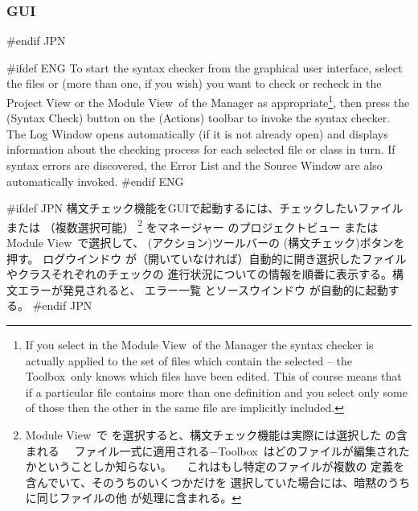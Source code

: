 \documentclass[\pformat,12pt]{article}
\newcommand{\Toolbox}{Toolbox}
\newcommand{\vdmModView}{\guicmd{Module View}}
\newcommand{\vdmModView}{\guicmd{モジュールビュー}}
\newcommand{\Toolbox}{Toolbox}
\newcommand{\vdmModView}{\guicmd{VDM View}}
\newcommand{\vdmModView}{\guicmd{VDMビュー}}
\newcommand{\guicmd}[1]{{\sf #1}}
\newcommand{\guicmd}[1]{{\gt #1}}
\begin{document}
\subsubsection{GUI}
#endif JPN

#ifdef ENG
To start the syntax checker from the graphical user interface, select 
the files or  (more than
one, if you wish) you want to check or recheck in the \guicmd{Project
  View} or the \vdmModView\ of the \guicmd{Manager} as
appropriate\footnote{If you select 
   in the 
  \vdmModView\ of the \guicmd{Manager} the syntax checker is
  actually applied to the set of files which contain the selected
   -- the \Toolbox\ only
  knows which files have been edited. This of course means
  that if a particular file contains more than one
   definition and you 
  select only some of those 
  then the other  in the
  same file are implicitly included.}, then press the
(\guicmd{Syntax Check})
button on the (\guicmd{Actions})
toolbar to invoke the syntax checker. The \guicmd{Log Window} opens
automatically (if it is not already open) and displays information
about the checking process for each selected file or class in turn. If
syntax errors are discovered, the \guicmd{Error 
List} and the \guicmd{Source Window} are also 
au\-to\-matically invoked. 
#endif ENG

#ifdef JPN
構文チェック機能をGUIで起動するには、チェックしたいファイルまたは
 （複数選択可能）
\footnote{
  \vdmModView\ で
   を選択すると、構文チェック機能は実際には選択した
   の含まれる
　ファイル一式に適用される−\Toolbox\ はどのファイルが編集されたかということしか知らない。
　これはもし特定のファイルが複数の
   定義を含んでいて、そのうちのいくつかだけを
  選択していた場合には、暗黙のうちに同じファイルの他
   が処理に含まれる。
}
を\guicmd{マネージャー} の\guicmd{プロジェクトビュー} または\vdmModView\ で選択して、
(\guicmd{アクション})ツールバーの   
(\guicmd{構文チェック})ボタンを押す。
\guicmd{ログウインドウ} が（開いていなければ）自動的に開き選択したファイルやクラスそれぞれのチェックの
進行状況についての情報を順番に表示する。構文エラーが発見されると、
\guicmd{エラー一覧} と\guicmd{ソースウインドウ} が自動的に起動する。
#endif JPN
\end{document}
